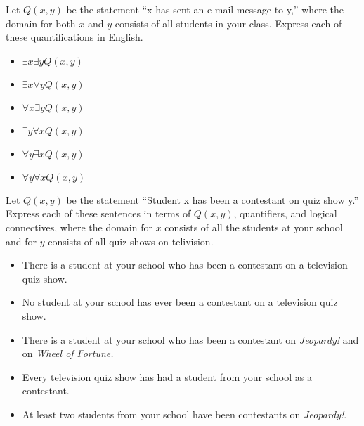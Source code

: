 \documentclass{article}
\newenvironment{problem}[2][Problem]{\begin{trivlist}
\item[\hskip \labelsep {\bfseries #1}\hskip \labelsep {\bfseries #2.}]}{\end{trivlist}}
\begin{document}
\begin{problem}{15}
    Let $Q(x,y)$ be the statement ``x has sent an e-mail message to y,'' where the domain for both $x$ and $y$ consists of all students in your class. Express each of these quantifications in English.
    \begin{itemize}
        \item[(a)] $\exists x \exists y Q(x,y)$
        \item[(b)] $\exists x \forall y Q(x,y)$ 
        \item[(c)] $\forall x \exists y Q(x,y)$
        \item[(d)] $\exists y \forall x Q(x,y)$ 
        \item[(e)] $\forall y \exists x Q(x,y)$
        \item[(f)] $\forall y \forall x Q(x,y)$
    \end{itemize}
\end{problem}

\begin{problem}{16}
    Let $Q(x,y)$ be the statement ``Student x has been a contestant on quiz show y.'' Express each of these sentences in terms of $Q(x,y)$, quantifiers, and logical connectives, where the domain for $x$ consists of all 
    the students at your school and for $y$ consists of all quiz shows on telivision.
    \begin{itemize}
        \item[(a)] There is a student at your school who has been a contestant on a television quiz show.
        \item[(b)] No student at your school has ever been a contestant on a television quiz show.
        \item[(c)] There is a student at your school who has been a contestant on \textit{Jeopardy!} and on \textit{Wheel of Fortune.} 
        \item[(d)] Every television quiz show has had a student from your school as a contestant.
        \item[(e)] At least two students from your school have been contestants on \textit{Jeopardy!}. 
    \end{itemize}
    
\end{problem}
\end{document}

